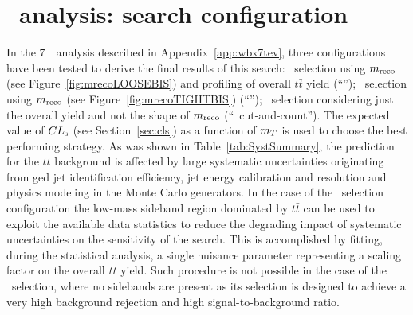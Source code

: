 \clearpage{\pagestyle{empty}\cleardoublepage}

\chapter{\wbx\ analysis: search configuration}\label{app:wbx_statanalyses}

In the 7~\tev\ analysis
described in Appendix~\ref{app:wbx7tev},
three configurations have been tested to derive the final
results of this search: \loose\ selection using
$m_{\rm reco}$ (see Figure~\ref{fig:mrecoLOOSEBIS}) 
and profiling of overall $t\bar{t}$ yield (``\loose''); \tight\ selection 
using $m_{\rm reco}$ (see Figure~\ref{fig:mrecoTIGHTBIS})
(``\tight''); \tight\ selection  considering just the overall yield and not 
the shape of $m_{\rm reco}$ (``\tight\ cut-and-count'').
The expected value of $CL_{\rm s}$ (see Section~\ref{sec:cls})
as a function of $m_{\T}$ is
used to choose the best performing strategy.
As was shown in Table~\ref{tab:SystSummary}, the prediction for 
the $t\bar{t}$ background is affected by 
large systematic uncertainties originating from \btag ged jet 
identification efficiency, 
jet energy calibration and resolution and physics modeling in the Monte
Carlo generators. 
In the case of the \loose\ selection configuration the low-mass sideband
region dominated by $t\bar{t}$ can be used to exploit the available data 
statistics to reduce the degrading 
impact of systematic uncertainties on the sensitivity of the search. 
This is accomplished by fitting, during the statistical analysis,
a single nuisance parameter representing a scaling factor on 
the overall $t\bar{t}$ yield. Such procedure is
not possible in the case of the \tight\ selection, where no
sidebands are present as its selection is designed 
to achieve a very high background rejection and high signal-to-background ratio.

